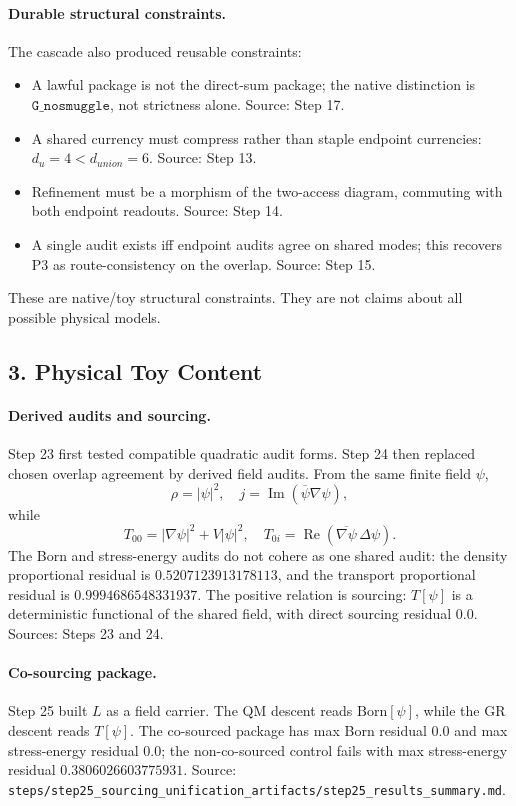 \paragraph{Durable structural constraints.}
The cascade also produced reusable constraints:

\begin{itemize}
\item A lawful package is not the direct-sum package; the native distinction is
  \(\texttt{G\_nosmuggle}\), not strictness alone.  Source: Step 17.
\item A shared currency must compress rather than staple endpoint currencies:
  \(d_u=4<d_{union}=6\).  Source: Step 13.
\item Refinement must be a morphism of the two-access diagram, commuting with
  both endpoint readouts.  Source: Step 14.
\item A single audit exists iff endpoint audits agree on shared modes; this
  recovers P3 as route-consistency on the overlap.  Source: Step 15.
\end{itemize}

These are native/toy structural constraints.  They are not claims about all
possible physical models.

\subsection*{3. Physical Toy Content}

\paragraph{Derived audits and sourcing.}
Step 23 first tested compatible quadratic audit forms.  Step 24 then replaced
chosen overlap agreement by derived field audits.  From the same finite field
\(\psi\),
\[
\rho=|\psi|^2,\quad
j=\operatorname{Im}(\overline{\psi}\nabla\psi),
\]
while
\[
T_{00}=|\nabla\psi|^2+V|\psi|^2,\quad
T_{0i}=\operatorname{Re}(\overline{\nabla\psi}\,\Delta\psi).
\]
The Born and stress-energy audits do not cohere as one shared audit: the
density proportional residual is \(0.5207123913178113\), and the transport
proportional residual is \(0.9994686548331937\).  The positive relation is
sourcing: \(T[\psi]\) is a deterministic functional of the shared field, with
direct sourcing residual \(0.0\).  Sources: Steps 23 and 24.

\paragraph{Co-sourcing package.}
Step 25 built \(L\) as a field carrier.  The QM descent reads
\(\text{Born}[\psi]\), while the GR descent reads \(T[\psi]\).  The co-sourced
package has max Born residual \(0.0\) and max stress-energy residual \(0.0\);
the non-co-sourced control fails with max stress-energy residual
\(0.3806026603775931\).  Source:
\texttt{steps/step25\_sourcing\_unification\_artifacts/step25\_results\_summary.md}.

